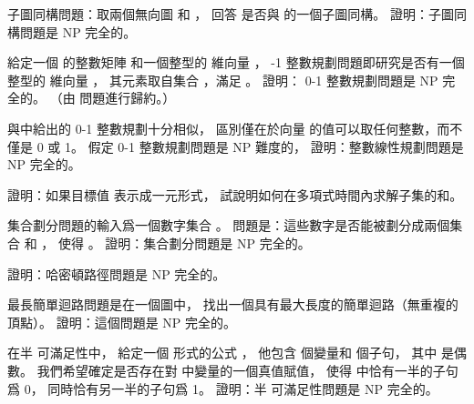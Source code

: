 \startsection[
  title={NP-complete problems},
]

\startEXERCISE
{\EMP 子圖同構問題}：取兩個無向圖  和 ，
回答  是否與  的一個子圖同構。
證明：子圖同構問題是 NP 完全的。
\stopEXERCISE

\startANSWER
{}
\stopANSWER

\startEXERCISE[exercise:34.5-2]
給定一個  的整數矩陣  和一個整型的  維向量 ，
 {-1 整數規劃問題}即研究是否有一個整型的  維向量 ，
其元素取自集合 ，滿足 。
證明： 0-1 整數規劃問題是 NP 完全的。
（\hint 由  問題進行歸約。）
\stopEXERCISE

\startANSWER
{}
\stopANSWER

與\inexercise[34.5-2] 中給出的 0-1 整數規劃十分相似，
區別僅在於向量  的值可以取任何整數，而不僅是 0 或 1。
假定 0-1 整數規劃問題是 NP 難度的，
證明：整數線性規劃問題是 NP 完全的。
\stopEXERCISE

\startANSWER
{}
\stopANSWER

\startEXERCISE
證明：如果目標值  表示成一元形式，
試說明如何在多項式時間內求解子集的和。
\stopEXERCISE

\startANSWER
{}
\stopANSWER

\startEXERCISE
{\EMP 集合劃分問題}的輸入爲一個數字集合 。
問題是：這些數字是否能被劃分成兩個集合  和 ，
使得 。
證明：集合劃分問題是 NP 完全的。
\stopEXERCISE

\startANSWER
{}
\stopANSWER

\startEXERCISE
證明：哈密頓路徑問題是 NP 完全的。
\stopEXERCISE

\startANSWER
{}
\stopANSWER

\startEXERCISE
{\EMP 最長簡單迴路問題}是在一個圖中，
找出一個具有最大長度的簡單迴路（無重複的頂點）。
證明：這個問題是 NP 完全的。
\stopEXERCISE

\startANSWER
{}
\stopANSWER

\startEXERCISE
在{\EMP 半  可滿足性}中，
給定一個  形式的公式 \m{\phi}，
他包含  個變量和  個子句，
其中  是偶數。
我們希望確定是否存在對 \m{\phi} 中變量的一個真值賦值，
使得 \m{\phi} 中恰有一半的子句爲 0，
同時恰有另一半的子句爲 1。
證明：半  可滿足性問題是 NP 完全的。
\stopEXERCISE

\startANSWER
{}
\stopANSWER

\stopsection
